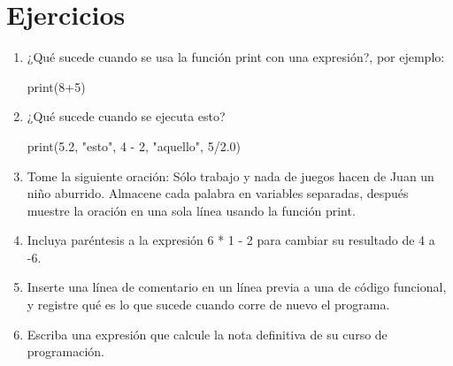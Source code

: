 \begin{description}
   
  
  
   
  
\end{description}

\section{Ejercicios}
\begin{enumerate}
\item ¿Qué sucede cuando se usa la función print con una expresión?, por
ejemplo: 
\begin{pythoncode}
print(8+5)
\end{pythoncode}
\item ¿Qué sucede cuando se ejecuta esto?
\begin{pythoncode}
print(5.2, "esto", 4 - 2, "aquello", 5/2.0)
\end{pythoncode}
\item Tome la siguiente oración: Sólo trabajo y nada de juegos hacen de
Juan un niño aburrido. Almacene cada palabra en variables separadas,
después muestre la oración en una sola línea usando la función print.
\item Incluya paréntesis a la expresión 6 {*} 1 - 2 para cambiar su resultado
de 4 a -6.
\item Inserte una línea de comentario en un línea previa a una de código
funcional, y registre qué es lo que sucede cuando corre de nuevo el
programa.
%
\item Escriba una expresión que calcule la nota definitiva de su curso de
programación.
\end{enumerate}

